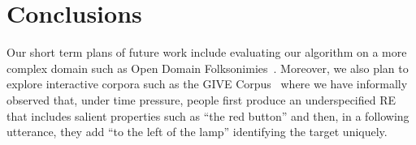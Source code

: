 \section{Conclusions}\label{sec:conclusion}

Our short term plans of future work include evaluating our algorithm on a more complex domain such as Open Domain Folksonimies~\cite{pacheco-duboue-dominguez:2012:NAACL-HLT}. Moreover, we also plan to explore interactive corpora such as the GIVE Corpus~\cite{GarGarKolStr10} where we have informally observed that, under time pressure, people first produce an underspecified RE that includes salient properties such as ``the red button'' and then, in a following utterance, they add ``to the left of the lamp'' identifying the target uniquely. 

